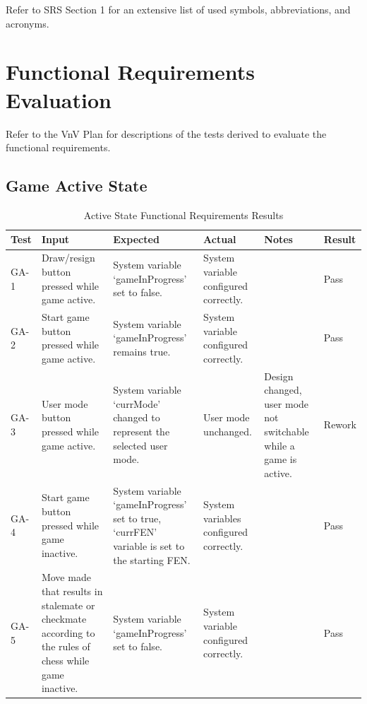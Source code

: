 \documentclass[12pt, titlepage]{article}
\begin{document}
Refer to SRS Section 1 for an extensive list of used symbols, abbreviations, and acronyms.

\newpage

\tableofcontents

\listoftables %

\listoffigures %

\newpage


\section{Functional Requirements Evaluation}
Refer to the VnV Plan for descriptions of the tests derived to evaluate the functional requirements.
\subsection{Game Active State}

\begin{table}[H]
    \centering
        \setlength{\leftmargini}{0.4cm}
        \begin{tabular}{| >{\centering\arraybackslash}m{1cm} | 
            >{\centering\arraybackslash}m{2.5cm} | 
            >{\centering\arraybackslash}m{4cm} | 
            >{\centering\arraybackslash}m{3cm} |
            >{\centering\arraybackslash}m{3cm} |
            >{\centering\arraybackslash}m{1.5cm} |}
        \hline
        \rowcolor[gray]{0.9}
        Test & Input & Expected & Actual & Notes & Result\\
        \hline
        GA-1 & Draw/resign button pressed while game active. & System variable `gameInProgress' set to false. &  System variable configured correctly. &  & Pass \\
        \hline
        GA-2 & Start game button pressed while game active. & System variable `gameInProgress' remains true. &  System variable configured correctly. &  & Pass \\
        \hline
        GA-3 & User mode button pressed while game active. & System variable `currMode' changed to represent the selected user mode. &  User mode unchanged. & Design changed, user mode not switchable while a game is active. & Rework \\
        \hline
        GA-4 & Start game button pressed while game inactive. & System variable `gameInProgress' set to true, `currFEN' variable is set to the starting FEN. &  System variables configured correctly. &  & Pass \\
        \hline
        GA-5 & Move made that results in stalemate or checkmate according to the rules of chess while game inactive. & System variable `gameInProgress' set to false. &  System variable configured correctly. &  & Pass \\ 
        \hline
        \end{tabular}
    \caption{Active State Functional Requirements Results}
\end{table}
\end{document}
